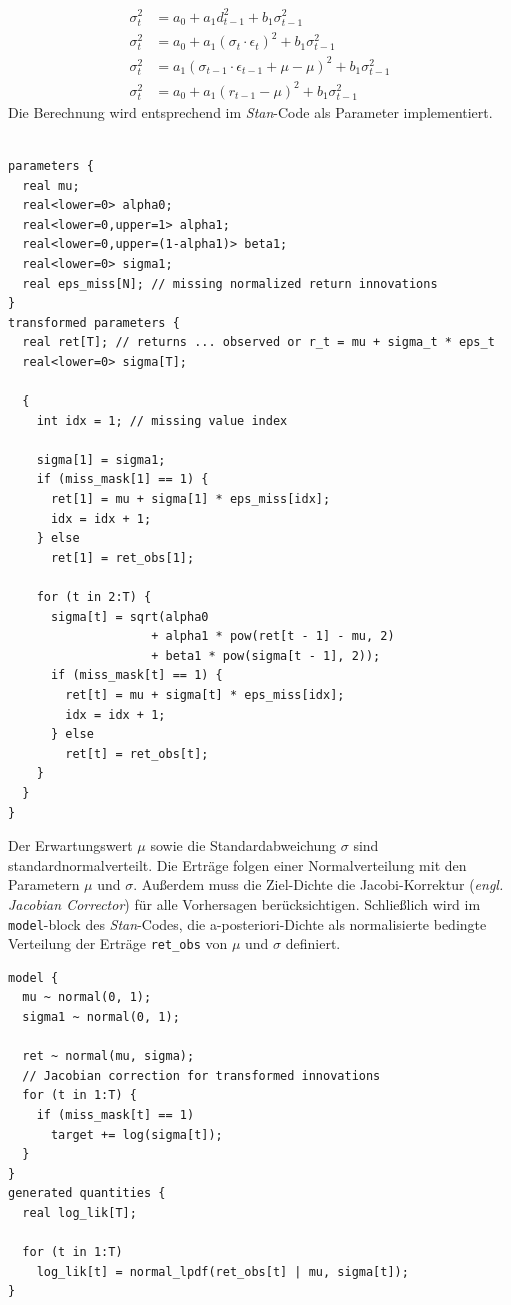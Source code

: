 \documentclass[ngerman]{ttlab-qualify}
\begin{document}
\begin{align}
\sigma_t^2 &= a_0 + a_1d_{t-1}^2 + b_1\sigma_{t-1}^2 \nonumber \\
\sigma_t^2 &=a_0+a_1(\sigma_t\cdot \epsilon_t)^2 + b_1\sigma_{t-1}^2\nonumber \\
\sigma_t^2 &=a_1(\sigma_{t-1}\cdot \epsilon_{t-1} +\mu -\mu)^2 +b_1\sigma_{t-1}^2 \nonumber \\
\sigma_t^2 &= a_0+a_1(r_{t-1}-\mu)^2 +b_1\sigma_{t-1}^2
\end{align} 
Die Berechnung wird entsprechend im \textit{Stan}-Code als Parameter implementiert.
\begin{lstlisting}[style=custom]

parameters {
  real mu;
  real<lower=0> alpha0;
  real<lower=0,upper=1> alpha1;
  real<lower=0,upper=(1-alpha1)> beta1;
  real<lower=0> sigma1;
  real eps_miss[N]; // missing normalized return innovations
}
transformed parameters {
  real ret[T]; // returns ... observed or r_t = mu + sigma_t * eps_t
  real<lower=0> sigma[T];

  {
    int idx = 1; // missing value index

    sigma[1] = sigma1;
    if (miss_mask[1] == 1) {
      ret[1] = mu + sigma[1] * eps_miss[idx];
      idx = idx + 1;
    } else
      ret[1] = ret_obs[1];

    for (t in 2:T) {
      sigma[t] = sqrt(alpha0
                    + alpha1 * pow(ret[t - 1] - mu, 2)
                    + beta1 * pow(sigma[t - 1], 2));
      if (miss_mask[t] == 1) {
        ret[t] = mu + sigma[t] * eps_miss[idx];
        idx = idx + 1;
      } else
        ret[t] = ret_obs[t];
    }
  }
}

\end{lstlisting}
Der Erwartungswert $\mu$ sowie die Standardabweichung $\sigma$ sind standardnormalverteilt. Die Erträge folgen einer Normalverteilung mit den Parametern $\mu$ und $\sigma$. Außerdem muss die Ziel-Dichte die Jacobi-Korrektur (\textit{engl. Jacobian Corrector}) für alle Vorhersagen berücksichtigen.
Schließlich wird im \verb|model|-block des \textit{Stan}-Codes, die a-posteriori-Dichte als normalisierte bedingte Verteilung der Erträge \verb|ret_obs| von $\mu$ und $\sigma$ definiert.

\begin{lstlisting}[style=custom]
model {
  mu ~ normal(0, 1);
  sigma1 ~ normal(0, 1);

  ret ~ normal(mu, sigma);
  // Jacobian correction for transformed innovations
  for (t in 1:T) {
    if (miss_mask[t] == 1)
      target += log(sigma[t]);
  }
}
generated quantities {
  real log_lik[T];

  for (t in 1:T)
    log_lik[t] = normal_lpdf(ret_obs[t] | mu, sigma[t]);
}
\end{lstlisting}
 
\end{document}
